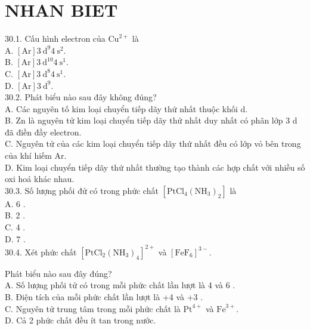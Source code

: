 \documentclass[10pt]{article}
\begin{document}
\section*{NHAN BIET}
30.1. Cấu hình electron của $\mathrm{Cu}^{2+}$ là\\
A. $[\mathrm{Ar}] 3 \mathrm{~d}^{9} 4 \mathrm{~s}^{2}$.\\
B. $[\mathrm{Ar}] 3 \mathrm{~d}^{10} 4 \mathrm{~s}^{1}$.\\
C. $[\mathrm{Ar}] 3 \mathrm{~d}^{8} 4 \mathrm{~s}^{1}$.\\
D. $[\mathrm{Ar}] 3 \mathrm{~d}^{9}$.\\
30.2. Phát biểu nào sau đây không đúng?\\
A. Các nguyên tố kim loại chuyển tiếp dãy thứ nhất thuộc khối d.\\
B. Zn là nguyên tử kim loại chuyển tiếp dãy thứ nhất duy nhất có phân lớp 3 d đã điền đầy electron.\\
C. Nguyên tử của các kim loại chuyển tiếp dãy thứ nhất đều có lớp vỏ bên trong của khí hiếm Ar.\\
D. Kim loại chuyển tiếp dãy thứ nhất thường tạo thành các hợp chất với nhiều số oxi hoá khác nhau.\\
30.3. Số lượng phối đử có trong phức chất $\left[\mathrm{PtCl}_{4}\left(\mathrm{NH}_{3}\right)_{2}\right]$ là\\
A. 6 .\\
B. 2 .\\
C. 4 .\\
D. 7 .\\
30.4. Xét phức chất $\left[\mathrm{PtCl}_{2}\left(\mathrm{NH}_{3}\right)_{4}\right]^{2+}$ và $\left[\mathrm{FeF}_{6}\right]^{3-}$.

Phát biểu nào sau đây đúng?\\
A. Số lượng phối tử có trong mỗi phức chất lần lượt là 4 và 6 .\\
B. Điện tích của mỗi phức chất lần lượt là +4 và +3 .\\
C. Nguyên tử trung tâm trong mỗi phức chất là $\mathrm{Pt}^{4+}$ và $\mathrm{Fe}^{3+}$.\\
D. Cả 2 phức chất đều ít tan trong nước.
\end{document}

